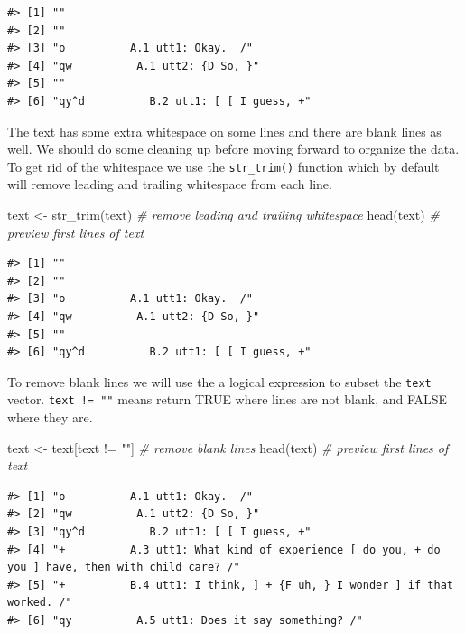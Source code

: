 \documentclass[
  letterpaper,
]{latex/krantz}
\newenvironment{Shaded}{\begin{snugshade}}{\end{snugshade}}
\newcommand{\CommentTok}[1]{\textcolor[rgb]{0.00,0.00,0.00}{\textit{#1}}}
\newcommand{\FunctionTok}[1]{\textcolor[rgb]{0.00,0.00,0.00}{#1}}
\newcommand{\NormalTok}[1]{\textcolor[rgb]{0.00,0.00,0.00}{#1}}
\newcommand{\OtherTok}[1]{\textcolor[rgb]{0.00,0.00,0.00}{#1}}
\newcommand{\SpecialCharTok}[1]{\textcolor[rgb]{0.00,0.00,0.00}{#1}}
\newcommand{\StringTok}[1]{\textcolor[rgb]{0.00,0.00,0.00}{#1}}
\begin{document}
\begin{verbatim}
#> [1] ""                                      
#> [2] ""                                      
#> [3] "o          A.1 utt1: Okay.  /"         
#> [4] "qw          A.1 utt2: {D So, }"        
#> [5] ""                                      
#> [6] "qy^d          B.2 utt1: [ [ I guess, +"
\end{verbatim}

The text has some extra whitespace on some lines and there are blank
lines as well. We should do some cleaning up before moving forward to
organize the data. To get rid of the whitespace we use the
\texttt{str\_trim()} function which by default will remove leading and
trailing whitespace from each line.

\begin{Shaded}
\begin{Highlighting}[]
\NormalTok{text }\OtherTok{\textless{}{-}} \FunctionTok{str\_trim}\NormalTok{(text) }\CommentTok{\# remove leading and trailing whitespace}
\FunctionTok{head}\NormalTok{(text) }\CommentTok{\# preview first lines of \textasciigrave{}text\textasciigrave{}}
\end{Highlighting}
\end{Shaded}

\begin{verbatim}
#> [1] ""                                      
#> [2] ""                                      
#> [3] "o          A.1 utt1: Okay.  /"         
#> [4] "qw          A.1 utt2: {D So, }"        
#> [5] ""                                      
#> [6] "qy^d          B.2 utt1: [ [ I guess, +"
\end{verbatim}

To remove blank lines we will use the a logical expression to subset the
\texttt{text} vector. \texttt{text\ !=\ ""} means return TRUE where
lines are not blank, and FALSE where they are.

\begin{Shaded}
\begin{Highlighting}[]
\NormalTok{text }\OtherTok{\textless{}{-}}\NormalTok{ text[text }\SpecialCharTok{!=} \StringTok{""}\NormalTok{] }\CommentTok{\# remove blank lines}
\FunctionTok{head}\NormalTok{(text) }\CommentTok{\# preview first lines of \textasciigrave{}text\textasciigrave{}}
\end{Highlighting}
\end{Shaded}

\begin{verbatim}
#> [1] "o          A.1 utt1: Okay.  /"                                                                  
#> [2] "qw          A.1 utt2: {D So, }"                                                                 
#> [3] "qy^d          B.2 utt1: [ [ I guess, +"                                                         
#> [4] "+          A.3 utt1: What kind of experience [ do you, + do you ] have, then with child care? /"
#> [5] "+          B.4 utt1: I think, ] + {F uh, } I wonder ] if that worked. /"                        
#> [6] "qy          A.5 utt1: Does it say something? /"
\end{verbatim}
\end{document}
